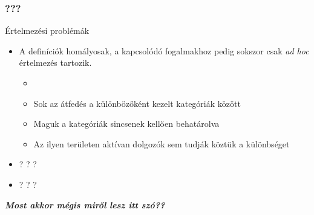 \begin{frame}
\frametitle{???}

\begin{block}{Értelmezési problémák}
	\begin{itemize}
		\item A definíciók homályosak, a kapcsolódó fogalmakhoz pedig sokszor csak \textit{ad hoc} értelmezés tartozik.
		\begin{itemize}
			\item \textit{}
			\item Sok az átfedés a különbözőként kezelt kategóriák között
			\item Maguk a kategóriák sincsenek kellően behatárolva
			\item Az ilyen területen aktívan dolgozók sem tudják köztük a különbséget
		\end{itemize}
		\item  {}? ? ?
		\item {}? ? ?
	\end{itemize}
\end{block}

\pause

\begin{alertblock}{}
	\centering
	\textbf{\textit{Most akkor mégis miről lesz itt szó??}}
\end{alertblock}


\end{frame}